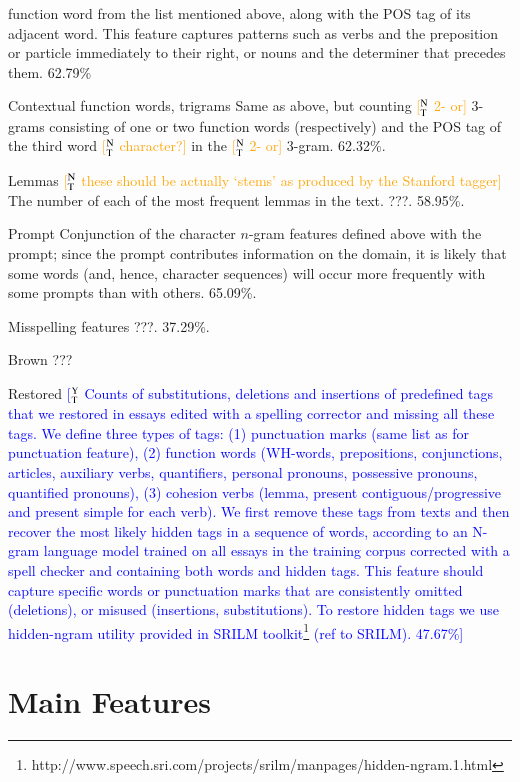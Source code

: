 \documentclass[11pt,letterpaper]{article}
\newcommand{\ensuretext}[1]{#1}
\newcommand{\ytmarker}{\ensuretext{\textcolor{blue}{\ensuremath{^{\textsc{Y}}_{\textsc{T}}}}}}
\newcommand{\ntmarker}{\ensuretext{\textcolor{green}{\ensuremath{^{\textsc{N}}_{\textsc{T}}}}}}
\newcommand{\arkcomment}[3]{\ensuretext{\textcolor{#3}{[#1 #2]}}}
\newcommand{\yt}[1]{\arkcomment{\ytmarker}{#1}{blue}}
\newcommand{\nt}[1]{\arkcomment{\ntmarker}{#1}{orange}}
\begin{document}
\begin{compactdesc}
  function word from the list mentioned above, along with the POS tag
  of its adjacent word. This feature captures patterns such as verbs
  and the preposition or particle immediately to their right, or nouns
  and the determiner that precedes them. 62.79\%
\item[Contextual function words, trigrams] Same as above, but counting
  \nt{2- or} 3-grams consisting of one or two function words (respectively) and the POS tag of the third word \nt{character?} in the \nt{2- or} 3-gram. 62.32\%.
\item[Lemmas] \nt{these should be actually `stems' as produced by the Stanford tagger} The number of each of the most frequent lemmas in the
  text. ???. 58.95\%.
\item[Prompt] Conjunction of the character $n$-gram features defined
  above with the prompt; since the prompt contributes information on
  the domain, it is likely that some words (and, hence, character
  sequences) will occur more frequently with some prompts than with
  others. 65.09\%.
\item[Misspelling features] ???. 37.29\%.
\item[Brown] ???
\item[Restored] \yt{Counts of substitutions, deletions and insertions of predefined tags that we restored in essays edited with a spelling  corrector and missing all these tags. We define three types of tags: (1) punctuation marks (same list as for punctuation feature), (2) function words (WH-words, prepositions, conjunctions, articles, auxiliary verbs, quantifiers, personal pronouns, possessive pronouns, quantified pronouns), (3) cohesion verbs (lemma, present contiguous/progressive and present simple for each verb). We first remove these tags from texts and then recover the most likely hidden tags in a sequence of words, according to an N-gram language model trained on all essays in the training corpus corrected with a spell checker and containing both words and hidden tags. This feature should capture specific words or punctuation marks that are consistently omitted (deletions), or misused (insertions, substitutions).  To restore hidden tags we use hidden-ngram utility provided in SRILM toolkit\footnote{http://www.speech.sri.com/projects/srilm/manpages/hidden-ngram.1.html} (ref to SRILM). 47.67\%}


\end{compactdesc}

\section{Main Features}\label{sec:mainfeats}
\end{document}
